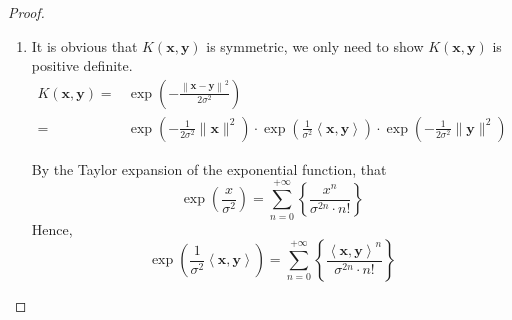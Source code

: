 \begin{proof}
    \begin{enumerate}
        \item It is obvious that $K(\mathbf{x},\mathbf{y})$ is symmetric, we only need to show $K(\mathbf{x},\mathbf{y})$ is positive definite.
              \begin{equation*}
                  \begin{aligned}
                      K(\mathbf{x},\mathbf{y})= & \exp\left(-\frac{\left\|\mathbf{x}-\mathbf{y}\right\|^{2}}{2\sigma^{2}}\right)                                                                                                                                  \\
                      =                         & \exp\left(-\frac{1}{2\sigma^{2}}\|\mathbf{x}\|^{2}\right)\cdot\exp\left(\frac{1}{\sigma^{2}}\left\langle\mathbf{x},\mathbf{y}\right\rangle\right)\cdot\exp\left(-\frac{1}{2\sigma^{2}}\|\mathbf{y}\|^{2}\right)
                  \end{aligned}
              \end{equation*}

              By the Taylor expansion of the exponential function, that
              \begin{equation*}
                  \exp\left(\frac{x}{\sigma^{2}}\right)=\sum_{n=0}^{+\infty}\left\{\frac{x^{n}}{\sigma^{2n}\cdot n!}\right\}
              \end{equation*}
              Hence,
              \begin{equation*}
                  \exp\left(\frac{1}{\sigma^{2}}\left\langle\mathbf{x},\mathbf{y}\right\rangle\right)=\sum_{n=0}^{+\infty}\left\{\frac{\left\langle\mathbf{x},\mathbf{y}\right\rangle^{n}}{\sigma^{2n}\cdot n!}\right\}
              \end{equation*}


\end{enumerate}
\end{proof}

